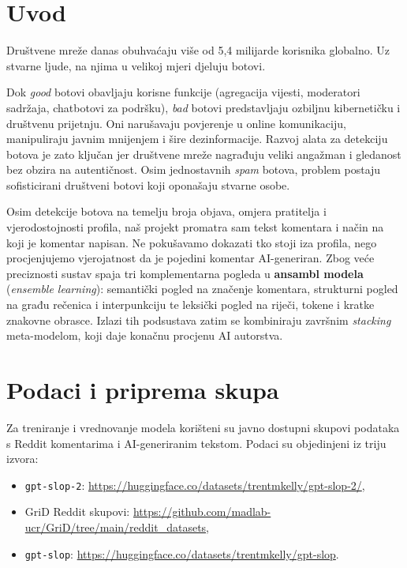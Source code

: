 \documentclass{article}
\begin{document}
\section{Uvod}

Društvene mreže danas obuhvaćaju više od 5,4 milijarde korisnika globalno. Uz stvarne ljude, na njima u velikoj mjeri djeluju botovi. 

Dok \textit{good} botovi obavljaju korisne funkcije (agregacija vijesti, moderatori sadržaja, chatbotovi za podršku), \textit{bad} botovi predstavljaju ozbiljnu kibernetičku i društvenu prijetnju. Oni narušavaju povjerenje u online komunikaciju, manipuliraju javnim mnijenjem i šire dezinformacije. Razvoj alata za detekciju botova je zato ključan jer društvene mreže nagrađuju veliki angažman i gledanost bez obzira na autentičnost. Osim jednostavnih \textit{spam} botova, problem postaju sofisticirani društveni botovi koji oponašaju stvarne osobe.

Osim detekcije botova na temelju broja objava, omjera pratitelja i vjerodostojnosti profila, naš projekt promatra sam tekst komentara i način na koji je komentar napisan. Ne pokušavamo dokazati tko stoji iza profila, nego procjenjujemo vjerojatnost da je pojedini komentar AI-generiran. Zbog veće preciznosti sustav spaja tri komplementarna pogleda u \textbf{ansambl modela} (\textit{ensemble learning}): semantički pogled na značenje komentara, strukturni pogled na građu rečenica i interpunkciju te leksički pogled na riječi, tokene i kratke znakovne obrasce. Izlazi tih podsustava zatim se kombiniraju završnim \textit{stacking} meta-modelom, koji daje konačnu procjenu AI autorstva.

\section{Podaci i priprema skupa}

Za treniranje i vrednovanje modela korišteni su javno dostupni skupovi podataka s Reddit komentarima i AI-generiranim tekstom. Podaci su objedinjeni iz triju izvora:

\begin{itemize}
    \item \texttt{gpt-slop-2}: \url{https://huggingface.co/datasets/trentmkelly/gpt-slop-2/},
    \item GriD Reddit skupovi: \url{https://github.com/madlab-ucr/GriD/tree/main/reddit_datasets},
    \item \texttt{gpt-slop}: \url{https://huggingface.co/datasets/trentmkelly/gpt-slop}.
\end{itemize}
\end{document}
